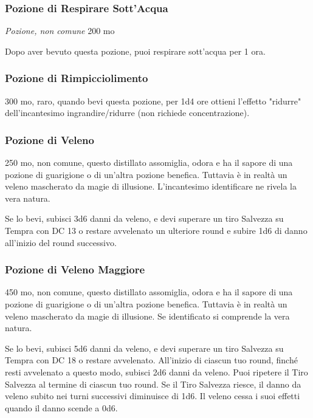 \begin{multicols}{2}
	\subsubsection*{Pozione di Respirare Sott'Acqua} \textit{Pozione, non comune} 200 mo

	Dopo aver bevuto questa pozione, puoi respirare sott'acqua per 1 ora.

	\subsubsection*{Pozione di Rimpicciolimento}
	300 mo, raro, quando bevi questa pozione, per 1d4 ore ottieni l'effetto "ridurre" dell'incantesimo ingrandire/ridurre (non richiede concentrazione).

	\subsubsection*{Pozione di Veleno}
	250 mo, non comune, questo distillato assomiglia, odora e ha il sapore di una pozione di guarigione o di un'altra pozione benefica. Tuttavia è in realtà un veleno mascherato da magie di illusione. L'incantesimo identificare ne rivela la vera natura.

	Se lo bevi, subisci 3d6 danni da veleno, e devi superare un tiro Salvezza su Tempra con DC 13 o restare avvelenato un ulteriore round e subire 1d6 di danno all'inizio del round successivo.

	\subsubsection*{Pozione di Veleno Maggiore}
	450 mo, non comune, questo distillato assomiglia, odora e ha il sapore di una pozione di guarigione o di un'altra pozione benefica. Tuttavia è in realtà un veleno mascherato da magie di illusione. Se identificato si comprende la vera natura.

	Se lo bevi, subisci 5d6 danni da veleno, e devi superare un tiro Salvezza su Tempra con DC 18 o restare avvelenato. All'inizio di ciascun tuo round, finché resti avvelenato a questo modo, subisci 2d6 danni da veleno. Puoi ripetere il Tiro Salvezza al termine di ciascun tuo round. Se il Tiro Salvezza riesce, il danno da veleno subito nei turni successivi diminuisce di 1d6. Il veleno cessa i suoi effetti quando il danno scende a 0d6.


\end{multicols}
